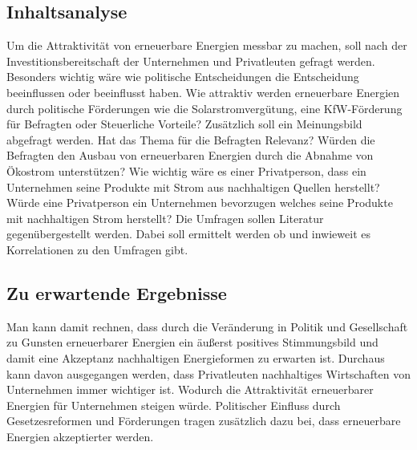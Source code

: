 \documentclass[12pt,a4paper]{article}
\begin{document}
\subsection*{Inhaltsanalyse}
Um die Attraktivität von erneuerbare Energien messbar zu machen, 
soll nach der Investitionsbereitschaft der Unternehmen und Privatleuten 
gefragt werden. Besonders wichtig wäre wie politische Entscheidungen die 
Entscheidung beeinflussen oder beeinflusst haben. Wie attraktiv werden erneuerbare 
Energien durch politische Förderungen wie die Solarstromvergütung, eine KfW-Förderung 
für Befragten oder Steuerliche Vorteile? 
 Zusätzlich soll ein Meinungsbild abgefragt werden. 
 Hat das Thema für die Befragten Relevanz? Würden die Befragten den 
 Ausbau von erneuerbaren Energien durch die Abnahme von Ökostrom unterstützen? 
 Wie wichtig wäre es einer Privatperson, dass ein Unternehmen seine Produkte mit Strom 
 aus nachhaltigen Quellen herstellt? Würde eine Privatperson ein Unternehmen bevorzugen 
 welches seine Produkte mit nachhaltigen Strom herstellt? Die Umfragen sollen Literatur 
 gegenübergestellt werden. Dabei soll ermittelt werden ob und inwieweit es Korrelationen 
 zu den Umfragen gibt. 

 \subsection*{Zu erwartende Ergebnisse }
 Man kann damit rechnen, dass durch die Veränderung in Politik und Gesellschaft 
 zu Gunsten erneuerbarer Energien ein äußerst positives Stimmungsbild und damit 
 eine Akzeptanz nachhaltigen Energieformen zu erwarten ist. Durchaus kann davon 
 ausgegangen werden, dass Privatleuten nachhaltiges Wirtschaften von Unternehmen immer 
 wichtiger ist. Wodurch die Attraktivität erneuerbarer Energien für Unternehmen steigen 
 würde. Politischer Einfluss durch Gesetzesreformen und Förderungen tragen zusätzlich 
 dazu bei, dass erneuerbare Energien akzeptierter werden. 

 

\nocite{*}
\printbibliography
\end{document}
